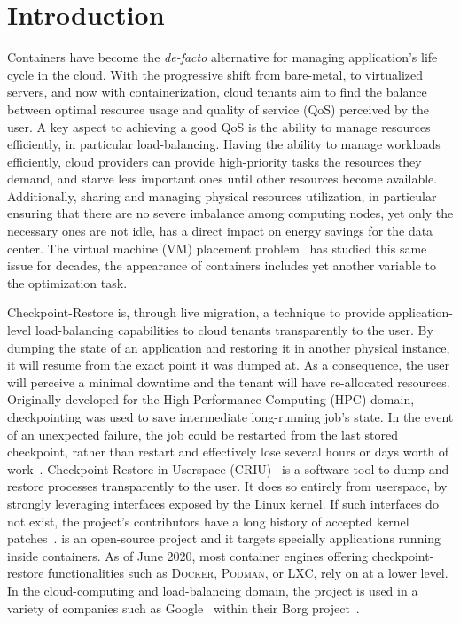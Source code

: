 \chapter{Introduction} \label{chap:introduction}

Containers have become the \textit{de-facto} alternative for managing
application's life cycle in the cloud.
With the progressive shift from bare-metal, to virtualized servers, and now
with containerization, cloud tenants aim to find the balance between optimal
resource usage and quality of service (QoS) perceived by the user.
A key aspect to achieving a good QoS is the ability to manage resources
efficiently, in particular load-balancing.
Having the ability to manage workloads efficiently, cloud providers can provide
high-priority tasks the resources they demand, and starve less important ones
until other resources become available.
Additionally, sharing and managing physical resources utilization, in
particular ensuring that there are no severe imbalance among computing nodes,
yet only the necessary ones are not idle, has a direct impact on energy savings
for the data center.
The virtual machine (VM) placement problem~\cite{Masdari2016,Strunk2012} has
studied this same issue for decades, the appearance of containers includes yet
another variable to the optimization task.

Checkpoint-Restore is, through live migration, a technique to provide
application-level load-balancing capabilities to cloud tenants transparently to
the user.
By dumping the state of an application and restoring it in another physical
instance, it will resume from the exact point it was dumped at.
As a consequence, the user will perceive a minimal downtime and the tenant will
have re-allocated resources.
Originally developed for the High Performance Computing (HPC) domain,
checkpointing was used to save intermediate long-running job's state.
In the event of an unexpected failure, the job could be restarted from the last
stored checkpoint, rather than restart and effectively lose several hours or
days worth of work~\cite{Barker2014}.
Checkpoint-Restore in Userspace (CRIU)~\cite{criu-main-page} is a software tool
to dump and restore processes transparently to the user.
It does so entirely from userspace, by strongly leveraging interfaces exposed
by the Linux kernel.
If such interfaces do not exist, the project's contributors have a long history
of accepted kernel patches~\cite{criu-kernel-patches}.
\criu is an open-source project and it targets specially applications running
inside containers.
As of June 2020, most container engines offering checkpoint-restore
functionalities such as \textsc{Docker}, \textsc{Podman}, or \textsc{LXC}, rely
on \criu at a lower level.
In the cloud-computing and load-balancing domain, the project is used in a
variety of companies such as Google~\cite{Tucker18} within their Borg
project~\cite{Verma2015}.

